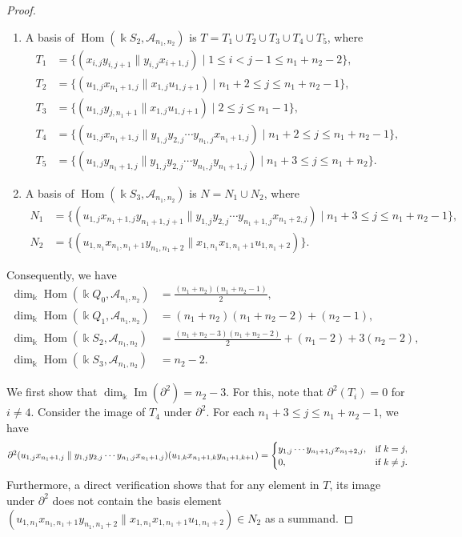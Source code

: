 \documentclass[a4paper, reqno, 11pt]{amsart}
\theoremstyle{definition}
\begin{document}
\begin{proof}
\begin{enumerate}[label=(\alph*), leftmargin=*, itemindent=0pt, labelindent=0pt, labelsep=0.5em]
		\allowdisplaybreaks
		\item A basis of $\operatorname{Hom}(\Bbbk S_2, \mathcal{A}_{n_1,n_2})$ is $T = T_1 \cup T_2 \cup T_3 \cup T_4 \cup T_5$, where
		\begin{align*}
			T_1 &= \{(x_{i,j}y_{i,j+1} \parallel y_{i,j}x_{i+1,j}) \mid 1 \le i<j-1 \le n_1+n_2-2\},\\
			T_2 &= \{(u_{1,j}x_{n_1+1,j} \parallel x_{1,j}u_{1,j+1}) \mid n_1+2 \le j \le n_1+n_2-1\},\\
			T_3 &= \{(u_{1,j}y_{j,n_1+1} \parallel x_{1,j}u_{1,j+1}) \mid 2 \le j \le n_1-1\},\\
			T_4 &= \{(u_{1,j}x_{n_1+1,j} \parallel y_{1,j}y_{2,j}\cdots y_{n_1,j}x_{n_1+1,j}) \mid n_1+2 \le j \le n_1+n_2-1\},\\
			T_5 &= \{(u_{1,j}y_{n_1+1,j} \parallel y_{1,j}y_{2,j}\cdots y_{n_1,j}y_{n_1+1,j}) \mid n_1+3 \le j \le n_1+n_2\}.
		\end{align*}
		\item A basis of $\operatorname{Hom}(\Bbbk S_3, \mathcal{A}_{n_1,n_2})$ is $N = N_1 \cup N_2$, where
		\begin{align*}
			N_1 &= \{(u_{1,j}x_{n_1+1,j}y_{n_1+1,j+1} \parallel y_{1,j}y_{2,j}\cdots y_{n_1+1,j}x_{n_1+2,j}) \mid n_1+3 \le j \le n_1+n_2-1\},\\
			N_2 &= \{(u_{1,n_1}x_{n_1,n_1+1}y_{n_1,n_1+2} \parallel x_{1,n_1}x_{1,n_1+1}u_{1,n_1+2})\}.
		\end{align*}
	\end{enumerate}
	
	Consequently, we have
	\allowdisplaybreaks
	\begin{align*}
		\dim_{\Bbbk} \operatorname{Hom}(\Bbbk Q_0, \mathcal{A}_{n_1,n_2}) &= \frac{(n_1+n_2)(n_1+n_2-1)}{2}, \\
		\dim_{\Bbbk} \operatorname{Hom}(\Bbbk Q_1, \mathcal{A}_{n_1,n_2}) &= (n_1+n_2)(n_1+n_2-2) + (n_2-1), \\
		\dim_{\Bbbk} \operatorname{Hom}(\Bbbk S_2, \mathcal{A}_{n_1,n_2}) &= \frac{(n_1+n_2-3)(n_1+n_2-2)}{2} + (n_1-2) + 3(n_2-2), \\
		\dim_{\Bbbk} \operatorname{Hom}(\Bbbk S_3, \mathcal{A}_{n_1,n_2}) &= n_2-2.
	\end{align*}
	
	We first show that $\dim_{\Bbbk}\operatorname{Im}(\partial^2) = n_2-3$. For this, note that $\partial^2(T_i) =0$ for $i\neq 4$. Consider the image of $T_4$ under $\partial^2$. For each $n_1+3 \le j \le n_1+n_2-1$, we have
	\[
	\scalebox{0.9}{$
		\partial^2(u_{1,j}x_{n_1+1,j} \parallel y_{1,j}y_{2,j}\cdots y_{n_1,j}x_{n_1+1,j})(u_{1,k}x_{n_1+1,k}y_{n_1+1,k+1}) = 
		\begin{cases}
			y_{1,j}\cdots y_{n_1+1,j}x_{n_1+2,j}, & \text{if } k=j,\\
			0, & \text{if } k\neq j.
		\end{cases}
		$}
	\]
	Furthermore, a direct verification shows that for any element in $T$, its image under $\partial^2$ does not contain the basis element $(u_{1,n_1}x_{n_1,n_1+1}y_{n_1,n_1+2} \parallel x_{1,n_1}x_{1,n_1+1}u_{1,n_1+2}) \in N_2$ as a summand.
	

\end{proof}
\end{document}
